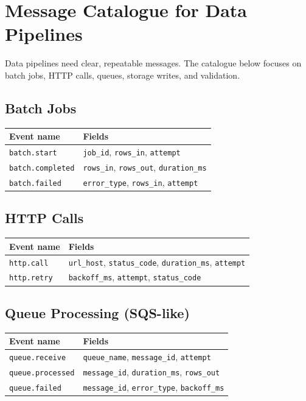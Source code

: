 \chapter{Message Catalogue for Data Pipelines}
Data pipelines need clear, repeatable messages. The catalogue below focuses on batch jobs, HTTP calls, queues, storage writes, and validation.

\section{Batch Jobs}
\begin{table}[h]
\centering
\begin{tabularx}{\textwidth}{lX}
\toprule
Event name & Fields \\
\midrule
\texttt{batch.start} & \texttt{job\_id}, \texttt{rows\_in}, \texttt{attempt} \\
\texttt{batch.completed} & \texttt{rows\_in}, \texttt{rows\_out}, \texttt{duration\_ms} \\
\texttt{batch.failed} & \texttt{error\_type}, \texttt{rows\_in}, \texttt{attempt} \\
\bottomrule
\end{tabularx}
\end{table}

\section{HTTP Calls}
\begin{table}[h]
\centering
\begin{tabularx}{\textwidth}{lX}
\toprule
Event name & Fields \\
\midrule
\texttt{http.call} & \texttt{url\_host}, \texttt{status\_code}, \texttt{duration\_ms}, \texttt{attempt} \\
\texttt{http.retry} & \texttt{backoff\_ms}, \texttt{attempt}, \texttt{status\_code} \\
\bottomrule
\end{tabularx}
\end{table}

\section{Queue Processing (SQS-like)}
\begin{table}[h]
\centering
\begin{tabularx}{\textwidth}{lX}
\toprule
Event name & Fields \\
\midrule
\texttt{queue.receive} & \texttt{queue\_name}, \texttt{message\_id}, \texttt{attempt} \\
\texttt{queue.processed} & \texttt{message\_id}, \texttt{duration\_ms}, \texttt{rows\_out} \\
\texttt{queue.failed} & \texttt{message\_id}, \texttt{error\_type}, \texttt{backoff\_ms} \\
\bottomrule
\end{tabularx}
\end{table}

